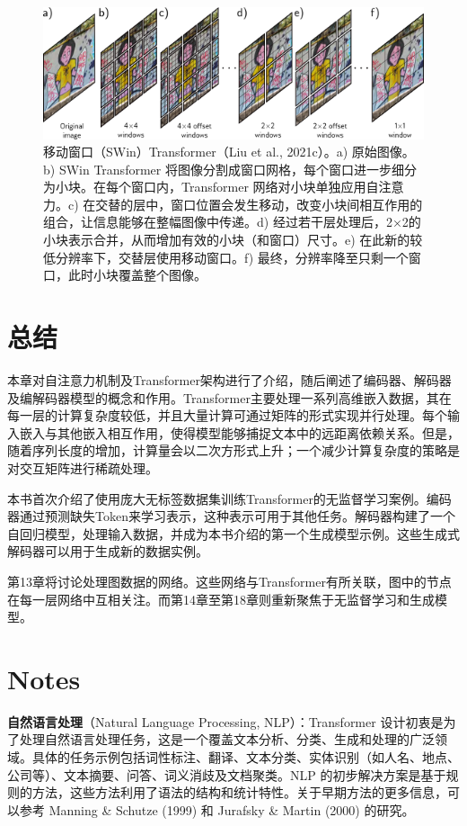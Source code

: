 \begin{figure}[ht!]
\centering
\includegraphics[width=0.7\linewidth]{png/chapter12/TransformerSWIN_compressed.png}
\caption{移动窗口（SWin）Transformer（Liu et al., 2021c）。a) 原始图像。b) SWin Transformer 将图像分割成窗口网格，每个窗口进一步细分为小块。在每个窗口内，Transformer 网络对小块单独应用自注意力。c) 在交替的层中，窗口位置会发生移动，改变小块间相互作用的组合，让信息能够在整幅图像中传递。d) 经过若干层处理后，2×2的小块表示合并，从而增加有效的小块（和窗口）尺寸。e) 在此新的较低分辨率下，交替层使用移动窗口。f) 最终，分辨率降至只剩一个窗口，此时小块覆盖整个图像。}
\end{figure}


\section{总结}
本章对自注意力机制及Transformer架构进行了介绍，随后阐述了编码器、解码器及编解码器模型的概念和作用。Transformer主要处理一系列高维嵌入数据，其在每一层的计算复杂度较低，并且大量计算可通过矩阵的形式实现并行处理。每个输入嵌入与其他嵌入相互作用，使得模型能够捕捉文本中的远距离依赖关系。但是，随着序列长度的增加，计算量会以二次方形式上升；一个减少计算复杂度的策略是对交互矩阵进行稀疏处理。

本书首次介绍了使用庞大无标签数据集训练Transformer的无监督学习案例。编码器通过预测缺失Token来学习表示，这种表示可用于其他任务。解码器构建了一个自回归模型，处理输入数据，并成为本书介绍的第一个生成模型示例。这些生成式解码器可以用于生成新的数据实例。

第13章将讨论处理图数据的网络。这些网络与Transformer有所关联，图中的节点在每一层网络中互相关注。而第14章至第18章则重新聚焦于无监督学习和生成模型。

\section{Notes}
\textbf{自然语言处理}（Natural Language Processing, NLP）：Transformer 设计初衷是为了处理自然语言处理任务，这是一个覆盖文本分析、分类、生成和处理的广泛领域。具体的任务示例包括词性标注、翻译、文本分类、实体识别（如人名、地点、公司等）、文本摘要、问答、词义消歧及文档聚类。NLP 的初步解决方案是基于规则的方法，这些方法利用了语法的结构和统计特性。关于早期方法的更多信息，可以参考 Manning \& Schutze (1999) 和 Jurafsky \& Martin (2000) 的研究。

